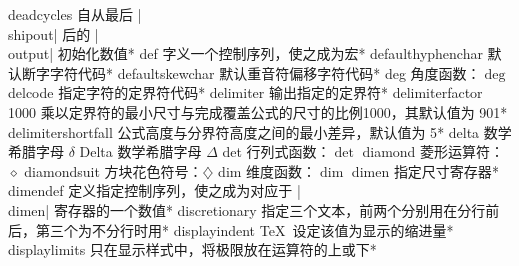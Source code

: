 \capcs deadcycles {自从最后 |\\shipout| 后的 |\\output| 初始化数值}*{}
\capcs def {字义一个控制序列，使之成为宏}*{}
\capcs defaulthyphenchar {默认断字字符代码}*{}
\capcs defaultskewchar {默认重音符偏移字符代码}*{}
\capcs deg {角度函数：$\deg$}{}{}
\capcs delcode {指定字符的定界符代码}*{}
\capcs delimiter {输出指定的定界符}*{}
\capcs delimiterfactor {1000 乘以定界符的最小尺寸与完成覆盖公式的尺寸的比例1000，其默认值为 901}*{}
\capcs delimitershortfall {公式高度与分界符高度之间的最小差异，默认值为 5\pt}*{}
\capcs delta {数学希腊字母 $\delta$}{}{}
\capcs Delta {数学希腊字母 $\Delta$}{}{}
\capcs det {行列式函数：$\det$}{}{}
\capcs diamond {菱形运算符：$\diamond$}{}{}
\capcs diamondsuit {方块花色符号：$\diamondsuit$}{}{}
\capcs dim {维度函数：$\dim$}{}{}
\capcs dimen {指定尺寸寄存器}*{}
\capcs dimendef {定义指定控制序列，使之成为对应于 |\\dimen| 寄存器的一个数值}*{}
\capcs discretionary {指定三个文本，前两个分别用在分行前后，第三个为不分行时用}*{}
\capcs displayindent {\TeX\ 设定该值为显示的缩进量}*{}
\capcs displaylimits {只在显示样式中，将极限放在运算符的上或下}*{}
